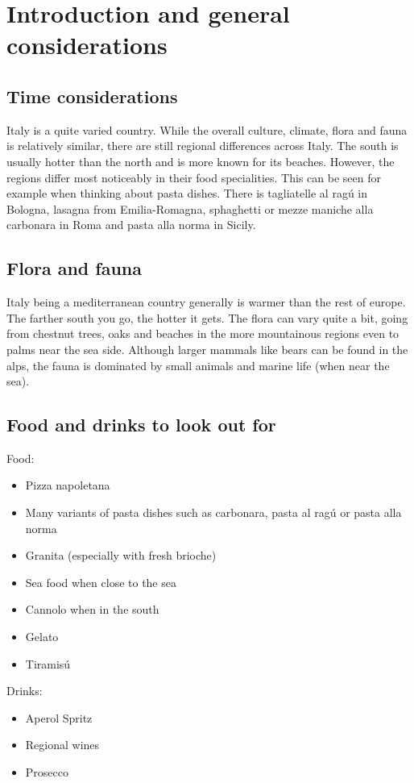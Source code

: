 \documentclass[11pt,a4paper,sans,english]{article}
\begin{document}
\section{Introduction and general considerations}
\subsection{Time considerations}
Italy is a quite varied country. While the overall culture, climate, flora and fauna is relatively similar, there are still regional differences across Italy. 
The south is usually hotter than the north and is more known for its beaches. However, the regions differ most noticeably in their food specialities.
This can be seen for example when thinking about pasta dishes. There is tagliatelle al ragú in Bologna, lasagna from Emilia-Romagna, sphaghetti or mezze maniche alla carbonara in Roma and pasta alla norma in Sicily.

\subsection{Flora and fauna}
Italy being a mediterranean country generally is warmer than the rest of europe. The farther south you go, the hotter it gets. The flora can vary quite a bit, going from chestnut trees, oaks and beaches in the more mountainous regions even to palms near the sea side.
Although larger mammals like bears can be found in the alps, the fauna is dominated by small animals and marine life (when near the sea).

\subsection{Food and drinks to look out for}
Food:
\begin{itemize}
	\itemsep-0.5em 
	\item Pizza napoletana
	\item Many variants of pasta dishes such as carbonara, pasta al ragú or pasta alla norma
	\item Granita (especially with fresh brioche)
	\item Sea food when close to the sea
	\item Cannolo when in the south
	\item Gelato
	\item Tiramisú
\end{itemize}
Drinks:
\begin{itemize}
	\itemsep-0.5em 
	\item Aperol Spritz
	\item Regional wines
	\item Prosecco
\end{itemize}
\end{document}
